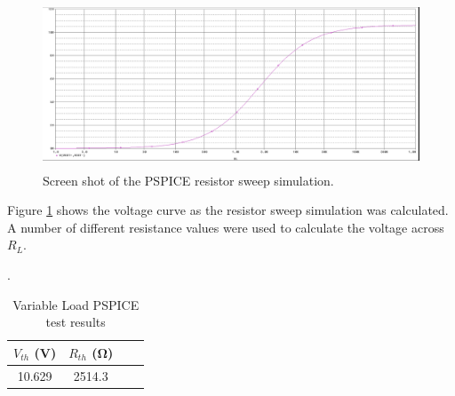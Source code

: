 \documentclass[11pt]{article}
\begin{document}
\begin{figure}[h!]
	\begin{center}
		\includegraphics[height=5cm]{simulation}
		\caption{Screen shot of the PSPICE resistor sweep simulation.}
		\label{Fig:SimulationSweep}
	\end{center}
\end{figure}

Figure \ref{Fig:SimulationSweep} shows the voltage curve as the resistor sweep simulation was calculated. A number of different resistance values were used to calculate the voltage across $R_L$.

\begin{table}[htbp]
	\caption{Variable Load PSPICE test results}.
	\begin{center}
	\label{Table:Lab3VariableLoadPSPICE}
	\begin{tabular}{|c|c|c|c|}
		\hline
		$V_{th}$ (\si{\volt})& %
		 $R_{th}$ (\si{\ohm}) \\
		\hline
		10.629	& 2514.3 \\	 \hline 
	\end{tabular}
	\end{center}
\end{table}
\end{document}
